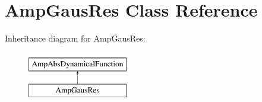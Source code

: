\hypertarget{class_amp_gaus_res}{\section{Amp\-Gaus\-Res Class Reference}
\label{class_amp_gaus_res}
}
Inheritance diagram for Amp\-Gaus\-Res\-:\begin{figure}[H]
\begin{center}
\leavevmode
\includegraphics[height=2.000000cm]{class_amp_gaus_res}
\end{center}
\end{figure}
